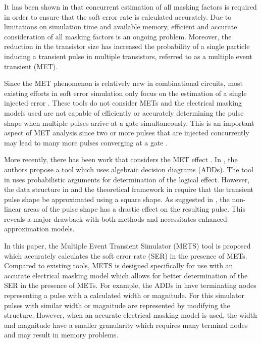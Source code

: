 \documentclass[conference]{IEEEtran}
\begin{document}
It has been shown in \cite{MARS_C,METSys} that concurrent estimation of all masking factors is required in order to ensure that the soft error rate is calculated accurately. Due to limitations on simulation time and available memory, efficient and accurate consideration of all masking factors is an ongoing problem. Moreover, the reduction in the transistor size has increased the probability of a single particle inducing a transient pulse in multiple transistors, referred to as a multiple event transient (MET).

Since the MET phenomenon is relatively new in combinational circuits, most existing efforts in soft error simulation only focus on the estimation of a single injected error \cite{Accurate_Masking,MARS_C}. These tools do not consider METs and the electrical masking models used are not capable of efficiently or accurately determining the pulse shape when multiple pulses arrive at a gate simultaneously. This is an important aspect of MET analysis since two or more pulses that are injected concurrently may lead to many more pulses converging at a gate . 

More recently, there has been work that considers the MET effect \cite{METSys,Gangadhar2011}. In \cite{METSys}, the authors propose a tool which uses algebraic decision diagrams (ADDs). The tool in \cite{Gangadhar2011} uses probabilistic arguments for determination of the logical effect. However, the data structure in \cite{METSys} and the theoretical framework in \cite{Gangadhar2011} require that the transient pulse shape be approximated using a square shape. As suggested in \cite{Accurate_Masking,Watkins2016}, the non-linear areas of the pulse shape has a drastic effect on the resulting pulse. This reveals a major drawback with both methods and necessitates enhanced approximation models. 

In this paper, the Multiple Event Transient Simulator (METS) tool is proposed which accurately calculates the soft error rate (SER) in the presence of METs. Compared to existing tools, METS is designed specifically for use with an accurate electrical masking model which allows for better determination of the SER in the presence of METs. For example, the ADDs in \cite{METSys} have terminating nodes representing a pulse with a calculated width or magnitude. For this simulator pulses with similar width or magnitude are represented by modifying the structure. However, when an accurate electrical masking model is used, the width and magnitude have a smaller granularity which requires many terminal nodes and may result in memory problems.
\end{document}
